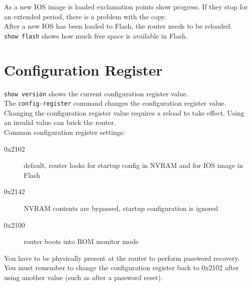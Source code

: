 \documentclass{article}
\begin{document}
As a new IOS image is loaded exclamation points show progress. If they stop
for an extended period, there is a problem with the copy.\\

After a new IOS has been loaded to Flash, the router needs to be reloaded.\\

\texttt{show flash} shows how much free space is available in Flash.

\section{Configuration Register}

\texttt{show version} shows the current configuration register value.\\

The \texttt{config-register} command changes the configuration register value.
Changing the configuration register value requires a reload to take effect.
Using an invalid value can brick the router.\\

Common configuration register settings:

\begin{description}

\item[0x2102]
default, router looks for startup config in NVRAM and for IOS image in Flash

\item[0x2142]
NVRAM contents are bypassed, startup configuration is ignored

\item[0x2100]
router boots into ROM monitor mode

\end{description}

You have to be physically present at the router to perform password recovery.\\

You must remember to change the configuration register back to 0x2102 after
using another value (such as after a password reset).
\end{document}
